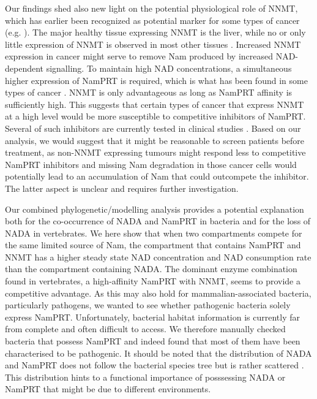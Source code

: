Our findings shed also new light on the potential physiological role of NNMT, which has earlier been recognized as potential marker for some types of cancer (e.g. \cite{Okamura1998}). The major healthy tissue expressing NNMT is the liver, while no or only little expression of NNMT is observed in most other tissues . Increased NNMT expression in cancer might serve to remove Nam produced by increased NAD-dependent signalling. To maintain high NAD concentrations, a simultaneous higher expression of NamPRT is required, which is what has been found in some types of cancer \cite{Bi2011,Wang2011}. NNMT is only advantageous as long as NamPRT affinity is sufficiently high. This suggests that certain types of cancer that express NNMT at a high level would be more susceptible to competitive inhibitors of NamPRT. Several of such inhibitors are currently tested in clinical studies \cite{Espindola-Netto2017} . Based on our analysis, we would suggest that it might be reasonable to screen patients before treatment, as non-NNMT expressing tumours might respond less to competitive NamPRT inhibitors and missing Nam degradation in those cancer cells would potentially lead to an accumulation of Nam that could outcompete the inhibitor. The latter aspect is unclear and requires further investigation.

Our combined phylogenetic/modelling analysis provides a potential explanation both for the co-occurrence of NADA and NamPRT in bacteria and for the loss of NADA in vertebrates. We here show that when two compartments compete for the same limited source of Nam, the compartment that contains NamPRT and NNMT has a higher steady state NAD concentration and NAD consumption rate than the compartment containing NADA. The dominant enzyme combination found in vertebrates, a high-affinity NamPRT with NNMT, seems to provide a competitive advantage. As this may also hold for mammalian-associated bacteria, particularly pathogens, we wanted to see whether pathogenic bacteria solely express NamPRT. Unfortunately, bacterial habitat information is currently far from complete and often difficult to access. We therefore manually checked bacteria that possess NamPRT and indeed found that most of them have been characterised to be pathogenic. It should be noted that the distribution of NADA and NamPRT does not follow the bacterial species tree but is rather scattered \cite{Gazzaniga2009}. This distribution hints to a functional importance of posssessing NADA or NamPRT that might be due to different environments.

